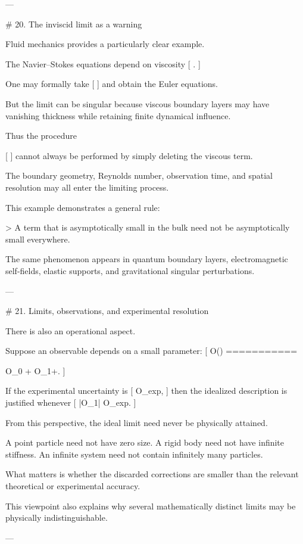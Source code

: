 ---

# 20. The inviscid limit as a warning

Fluid mechanics provides a particularly clear example.

The Navier--Stokes equations depend on viscosity
[
\nu.
]

One may formally take
[
\nu{}
]
and obtain the Euler equations.

But the limit can be singular because viscous boundary layers may have vanishing thickness while retaining finite dynamical influence.

Thus the procedure

[
\nu{}
]
cannot always be performed by simply deleting the viscous term.

The boundary geometry, Reynolds number, observation time, and spatial resolution may all enter the limiting process.

This example demonstrates a general rule:

> A term that is asymptotically small in the bulk need not be asymptotically small everywhere.

The same phenomenon appears in quantum boundary layers, electromagnetic self-fields, elastic supports, and gravitational singular perturbations.

---

# 21. Limits, observations, and experimental resolution

There is also an operational aspect.

Suppose an observable depends on a small parameter:
[
O(\epsilon)
===========

O_0
+
\epsilon O_1+\cdots.
]

If the experimental uncertainty is
[
\Delta O_{\rm exp},
]
then the idealized description is justified whenever
[
|\epsilon O_1|
\ll
\Delta O_{\rm exp}.
]

From this perspective, the ideal limit need never be physically attained.

A point particle need not have zero size. A rigid body need not have infinite stiffness. An infinite system need not contain infinitely many particles.

What matters is whether the discarded corrections are smaller than the relevant theoretical or experimental accuracy.

This viewpoint also explains why several mathematically distinct limits may be physically indistinguishable.

---

